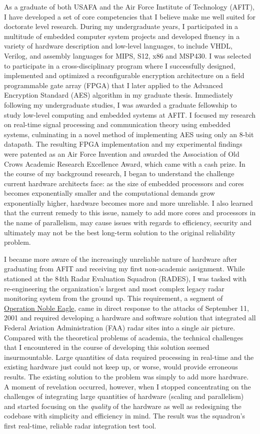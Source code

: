 \documentclass{article}
\begin{document}
As a graduate of both USAFA and the Air Force Institute of Technology
(AFIT), I have developed a set of core competencies that I believe make me well
suited for doctorate level research. During my undergraduate years, I
participated in a multitude of embedded computer system projects and developed fluency in a
variety of hardware description and low-level languages, to include VHDL,
Verilog, and assembly languages for MIPS, S12, x86 and MSP430. I was
selected to participate in a cross-disciplinary
program where I successfully designed, implemented and optimized a
reconfigurable encryption architecture on a field programmable gate array
(FPGA) that I later applied to the Advanced Encryption Standard (AES) algorithm
in my graduate thesis. Immediately following my undergraduate studies, I was
awarded a graduate fellowship to study low-level computing and embedded systems
at AFIT. I focused my research on real-time
signal processing and communication theory using embedded systems, culminating
in a novel method of implementing AES using only an 8-bit datapath.  The
resulting FPGA implementation and my experimental findings were patented as an Air Force
Invention and awarded the Association of Old Crows Academic Research Excellence
Award, which came with a cash prize. In the course of my background research, I
began to understand the challenge current hardware architects face: as the size
of embedded processors and cores becomes exponentially smaller and the
computational demands grow exponentially higher, hardware becomes more
and more unreliable. I also learned that the current remedy to this issue, namely to add
more cores and processors in the name of parallelism, may cause issues with
regards to efficiency, security and ultimately may not be the best long-term
solution to the original reliability problem.

I became more aware of the increasingly unreliable nature of hardware after
graduating from AFIT and receiving my first non-academic assignment. While
stationed at the 84th Radar Evaluation Squadron (RADES), I was tasked with
re-engineering the organization's largest and most complex legacy radar
monitoring system from the ground up. This requirement, a segment of
\href{http://en.wikipedia.org/wiki/Operation_Noble_Eagle}{Operation Noble
Eagle}, came in direct response to the attacks of September 11, 2001 and
required developing a hardware and software solution that integrated all
Federal Aviation Administration (FAA) radar sites into a single air picture.
Compared with the theoretical problems of academia, the technical challenges that I
encountered in the course of developing this solution seemed insurmountable.
Large quantities of data required processing in real-time and the existing
hardware just could not keep up, or worse, would provide erroneous results. The
existing solution to the problem was simply to add more hardware. A moment of
revelation occurred, however, when I
stopped concentrating on the challenges of integrating large quantities of hardware (scaling and parallelism) and
started focusing on the \emph{quality} of the hardware as well as redesigning the
codebase with simplicity and efficiency in mind. The result was the squadron's
first real-time, reliable radar integration test tool.
\end{document}
